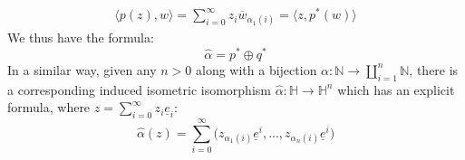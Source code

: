 \documentclass[12pt]{article}
\theoremstyle{plain}
\theoremstyle{definition}
\newcommand{\bb}[1]{\mathbb{#1}}
\newcommand{\lto}{\longrightarrow}
\begin{document}
	\begin{align*}
		\big\langle p(z),w \big\rangle = \sum_{i = 0}^\infty z_i\overline{w}_{\alpha_1(i)} = \big\langle z, p^\ast(w)\big\rangle
	\end{align*}
	We thus have the formula:
	\begin{equation}
		\hat{\alpha} = p^\ast \oplus q^\ast
	\end{equation}
	In a similar way, given any $n > 0$ along with a bijection $\alpha: \bb{N} \lto \coprod_{i = 1}^n\bb{N}$, there is a corresponding induced isometric isomorphism $\hat{\alpha}: \bb{H} \lto \bb{H}^n$ which has an explicit formula, where $z = \sum_{i = 0}^\infty z_i\underline{e}_i$:
	\begin{equation}
		\hat{\alpha}(z) = \sum_{i = 0}^\infty \Big(z_{\alpha_1(i)}\underline{e}^i,...,z_{\alpha_n(i)}\underline{e}^i\Big)
	\end{equation}
\end{document}

